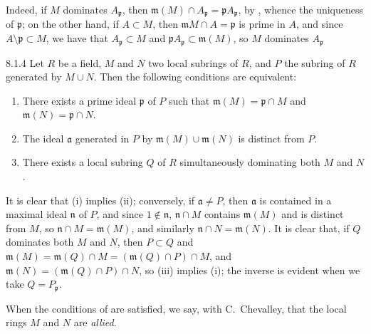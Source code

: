 Indeed, if $M$ dominates $A_\mathfrak{p}$, then $\mathfrak{m}(M)\cap
A_\mathfrak{p}=\mathfrak{p}A_\mathfrak{p}$, by , whence the
uniqueness of $\mathfrak{p}$; on the other hand, if $A\subset M$, then
$\mathfrak{m}M\cap A=\mathfrak{p}$ is prime in $A$, and since
$A\setminus\mathfrak{p}\subset M$, we have that $A_\mathfrak{p}\subset M$ and
$\mathfrak{p}A_\mathfrak{p}\subset\mathfrak{m}(M)$, so $M$ dominates
$A_\mathfrak{p}$

\begin{envs}[Lemma]{8.1.4}
\label{lem-1.8.1.4}
Let $R$ be a field, $M$ and $N$ two local
subrings of $R$, and $P$ the subring of $R$ generated by $M\cup N$. Then the
following conditions are equivalent:
\begin{enumerate}[label=\rm{(\roman*)}]
  \item There exists a prime ideal $\mathfrak{p}$ of $P$ such that
        $\mathfrak{m}(M)=\mathfrak{p}\cap M$ and $\mathfrak{m}(N)=\mathfrak{p}\cap N$.
  \item The ideal $\mathfrak{a}$ generated in $P$ by $\mathfrak{m}(M)\cup\mathfrak{m}(N)$ is
        distinct from $P$.
  \item There exists a local subring $Q$ of $R$ simultaneously dominating both $M$ and $N$.
\end{enumerate}
\end{envs}

It is clear that (i) implies (ii); conversely, if $\mathfrak{a}\neq P$, then
$\mathfrak{a}$ is contained in a maximal ideal $\mathfrak{n}$ of $P$, and since
$1\not\in\mathfrak{n}$, $\mathfrak{n}\cap M$ contains $\mathfrak{m}(M)$ and is
distinct from $M$, so $\mathfrak{n}\cap M=\mathfrak{m}(M)$, and similarly
$\mathfrak{n}\cap N=\mathfrak{m}(N)$. It is clear that, if $Q$ dominates both
$M$ and $N$, then $P\subset Q$ and
$\mathfrak{m}(M)=\mathfrak{m}(Q)\cap M=(\mathfrak{m}(Q)\cap P)\cap M$, and
$\mathfrak{m}(N)=(\mathfrak{m}(Q)\cap P)\cap N$, so (iii) implies (i); the inverse is evident
when we take $Q=P_\mathfrak{p}$.

When the conditions of  are satisfied, we say, with C.~Chevalley,
that the local rings $M$ and $N$ are \emph{allied}.

